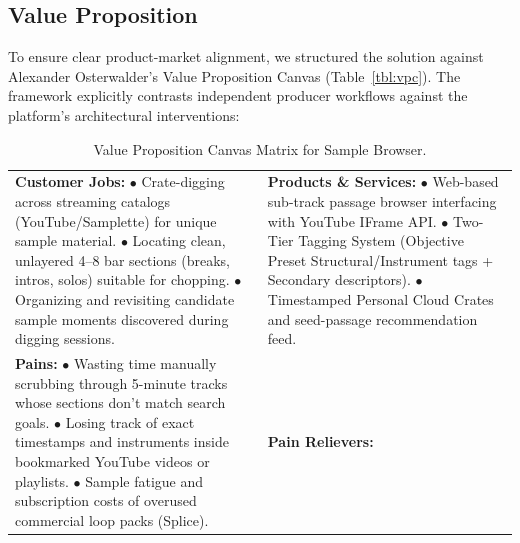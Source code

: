 \subsection*{Value Proposition}

To ensure clear product-market alignment, we structured the solution against Alexander Osterwalder's Value Proposition Canvas (Table~\ref{tbl:vpc}). The framework explicitly contrasts independent producer workflows against the platform's architectural interventions:

\begin{table}[htbp]
    \centering
    \small
    \caption{Value Proposition Canvas Matrix for Sample Browser.}
    \begin{tabularx}{\textwidth}{|>{\raggedright\arraybackslash}X|>{\raggedright\arraybackslash}X|}
        \hline
        \multicolumn{1}{|c|}{\textbf{CUSTOMER PROFILE (Music Producer)}} & \multicolumn{1}{c|}{\textbf{VALUE MAP (Sample Browser)}} \\
        \hline
        \textbf{Customer Jobs:} \newline 
        $\bullet$ Crate-digging across streaming catalogs (YouTube/Samplette) for unique sample material. \newline 
        $\bullet$ Locating clean, unlayered 4--8 bar sections (breaks, intros, solos) suitable for chopping. \newline 
        $\bullet$ Organizing and revisiting candidate sample moments discovered during digging sessions. & 
        \textbf{Products \& Services:} \newline 
        $\bullet$ Web-based sub-track passage browser interfacing with YouTube IFrame API. \newline 
        $\bullet$ Two-Tier Tagging System (Objective Preset Structural/Instrument tags + Secondary descriptors). \newline 
        $\bullet$ Timestamped Personal Cloud Crates and seed-passage recommendation feed. \\
        \hline
        \textbf{Pains:} \newline 
        $\bullet$ Wasting time manually scrubbing through 5-minute tracks whose sections don't match search goals. \newline 
        $\bullet$ Losing track of exact timestamps and instruments inside bookmarked YouTube videos or playlists. \newline 
        $\bullet$ Sample fatigue and subscription costs of overused commercial loop packs (Splice). & 
        \textbf{Pain Relievers:} \newline 

\end{tabularx}
\end{table}
